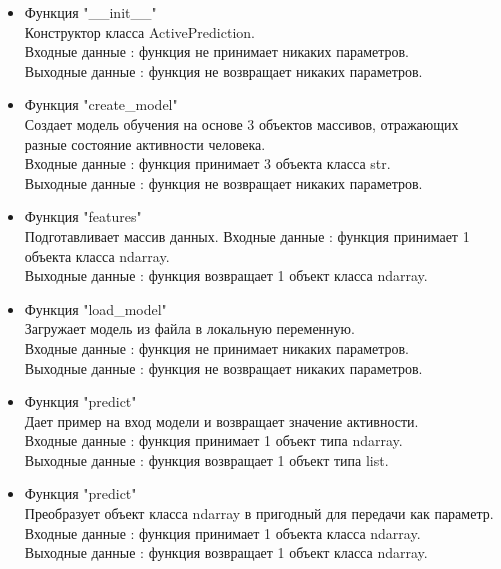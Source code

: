 \documentclass[a4document]{article}
\begin{document}
{\begin{itemize}
        \begin{itemize}
            \item Функция "\_\_init\_\_" \\
                Конструктор класса ActivePrediction.\\
                Входные данные : функция не принимает никаких параметров. \\ 
                Выходные данные : функция не возвращает никаких параметров.
            \item Функция "create\_model" \\
                Создает модель обучения на основе 3 объектов массивов, отражающих
                разные состояние активности человека.\\
                Входные данные : функция принимает 3 объекта класса str. \\ 
                Выходные данные : функция не возвращает никаких параметров.
            \item Функция "features" \\
                Подготавливает массив данных.
                Входные данные : функция принимает 1 объекта класса ndarray. \\ 
                Выходные данные : функция возвращает 1 объект класса ndarray.
            \item Функция "load\_model" \\
                Загружает модель из файла в локальную переменную.\\
                Входные данные : функция не принимает никаких параметров. \\ 
                Выходные данные : функция не возвращает никаких параметров.
            \item Функция "predict" \\
                Дает пример на вход модели и возвращает значение активности.\\
                Входные данные : функция принимает 1 объект типа  ndarray. \\ 
                Выходные данные : функция возвращает 1 объект типа list.
            \item Функция "predict" \\
                Преобразует объект класса ndarray в пригодный для передачи как параметр.\\
                Входные данные : функция принимает 1 объекта класса ndarray. \\ 
                Выходные данные : функция возвращает 1 объект класса ndarray.
        \end{itemize}
        

\end{itemize}}
\end{document}
